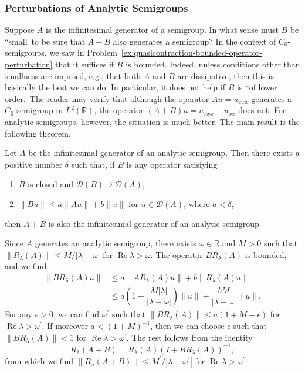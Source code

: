 \subsubsection{Perturbations of Analytic Semigroups}\label{subsec:analytic-semigroup-perturbations}

Suppose $A$ is the infinitesimal generator of a semigroup. In what sense must $B$ be ``small\textquotesingle\textquotesingle\ to be sure that $A+B$ also generates a semigroup? In the context of $C_0$-semigroups, we saw in Problem~\ref{ex:quasicontraction-bounded-operator-perturbation} that it suffices if $B$ is bounded. Indeed, unless conditions other than smallness are imposed, e.g., that both $A$ and $B$ are dissipative, then this is basically the best we can do. In particular, it does not help if $B$ is ``of lower order.\textquotesingle\textquotesingle\ The reader may verify that although the operator $Au=u_{xxx}$ generates a $C_0$-semigroup in $L^2(\mathbb{R})$, the operator $(A+B)u=u_{xxx}-u_{xx}$ does not. For analytic semigroups, however, the situation is much better. The main result is the following theorem.

\begin{Theorem}
\label{thm:analytic-generator-small-relative-perturbation}
Let $A$ be the infinitesimal generator of an analytic semigroup. Then there exists a positive number $\delta$ such that, if $B$ is any operator satisfying\begin{enumerate}\item $B$ is closed and $\mathcal{D}(B)\supseteq\mathcal{D}(A)$,\item $\|Bu\|\leq a\|Au\|+b\|u\|$ for $u\in\mathcal{D}(A)$, where $a<\delta$,\end{enumerate}then $A+B$ is also the infinitesimal generator of an analytic semigroup.
\end{Theorem}

\begin{Proof}
Since $A$ generates an analytic semigroup, there exists $\omega\in\mathbb{R}$ and $M>0$ such that $\|R_\lambda(A)\|\leq M/|\lambda-\omega|$ for $\operatorname{Re}\lambda>\omega$. The operator $BR_\lambda(A)$ is bounded, and we find\[\begin{aligned}
\|BR_\lambda(A)u\|&\leq a\|AR_\lambda(A)u\|+b\|R_\lambda(A)u\|\\
&\leq a\left(1+\dfrac{M|\lambda|}{|\lambda-\omega|}\right)\|u\|+\dfrac{bM}{|\lambda-\omega|}\|u\|.
\end{aligned}\]For any $\epsilon>0$, we can find $\omega^{\prime}$ such that $\|BR_\lambda(A)\|\leq a(1+M+\epsilon)$ for $\operatorname{Re}\lambda>\omega^{\prime}$. If moreover $a<(1+M)^{-1}$, then we can choose $\epsilon$ such that $\|BR_\lambda(A)\|<1$ for $\operatorname{Re}\lambda>\omega^{\prime}$. The rest follows from the identity
\begin{equation}\label{eq:analytic-generator-perturbation-resolvent-identity}
R_\lambda(A+B)=R_\lambda(A)(I+BR_\lambda(A))^{-1},
\end{equation}
from which we find $\|R_\lambda(A+B)\|\leq M^{\prime}/|\lambda-\omega^{\prime}|$ for $\operatorname{Re}\lambda>\omega^{\prime}$.
\end{Proof}

